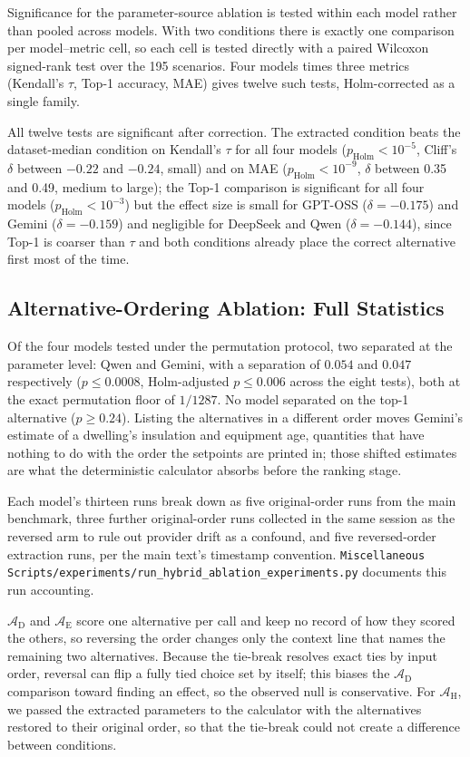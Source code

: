 \documentclass[11pt]{article}
\begin{document}
Significance for the parameter-source ablation is tested within each model rather than pooled across models. With two conditions there is exactly one comparison per model--metric cell, so each cell is tested directly with a paired Wilcoxon signed-rank test over the 195 scenarios. Four models times three metrics (Kendall's $\tau$, Top-1 accuracy, MAE) gives twelve such tests, Holm-corrected as a single family.

All twelve tests are significant after correction. The extracted condition beats the dataset-median condition on Kendall's $\tau$ for all four models ($p_{\text{Holm}} < 10^{-5}$, Cliff's $\delta$ between $-0.22$ and $-0.24$, small) and on MAE ($p_{\text{Holm}} < 10^{-9}$, $\delta$ between 0.35 and 0.49, medium to large); the Top-1 comparison is significant for all four models ($p_{\text{Holm}} < 10^{-3}$) but the effect size is small for GPT-OSS ($\delta=-0.175$) and Gemini ($\delta=-0.159$) and negligible for DeepSeek and Qwen ($\delta=-0.144$), since Top-1 is coarser than $\tau$ and both conditions already place the correct alternative first most of the time.

\subsection{Alternative-Ordering Ablation: Full Statistics}
\label{app:alternative-order-full}

Of the four models tested under the permutation protocol, two separated at the parameter level: Qwen and Gemini, with a separation of $0.054$ and $0.047$ respectively ($p \leq 0.0008$, Holm-adjusted $p \leq 0.006$ across the eight tests), both at the exact permutation floor of $1/1287$. No model separated on the top-1 alternative ($p \geq 0.24$). Listing the alternatives in a different order moves Gemini's estimate of a dwelling's insulation and equipment age, quantities that have nothing to do with the order the setpoints are printed in; those shifted estimates are what the deterministic calculator absorbs before the ranking stage.

Each model's thirteen runs break down as five original-order runs from the
main benchmark, three further original-order runs collected in the same
session as the reversed arm to rule out provider drift as a confound, and
five reversed-order extraction runs, per the main text's timestamp
convention. \texttt{Miscellaneous Scripts/experiments/run\_hybrid\_ablation\_experiments.py}
documents this run accounting.

$\mathcal{A}_{\text{D}}$ and $\mathcal{A}_{\text{E}}$ score one alternative per call and keep no record of how they scored the others, so reversing the order changes only the context line that names the remaining two alternatives. Because the tie-break resolves exact ties by input order, reversal can flip a fully tied choice set by itself; this biases the $\mathcal{A}_{\text{D}}$ comparison toward finding an effect, so the observed null is conservative. For $\mathcal{A}_{\text{H}}$, we passed the extracted parameters to the calculator with the alternatives restored to their original order, so that the tie-break could not create a difference between conditions.
\end{document}
